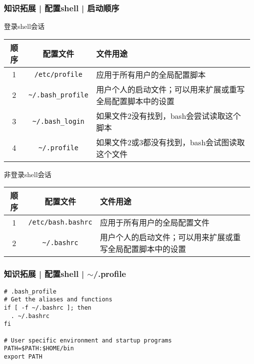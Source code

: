 \begin{frame}
  \frametitle{知识拓展 | 配置shell | 启动顺序}
  \begin{block}{登录shell会话}
  \begin{table}
    \centering
    \begin{tabularx}{\textwidth}{ccX}
      \hline
      \rowcolor{blue!50}顺序 & 配置文件 & 文件用途\\
      \hline
      1 & \verb|/etc/profile| & 应用于所有用户的全局配置脚本\\
      2 & \verb|~/.bash_profile| & 用户个人的启动文件；可以用来扩展或重写全局配置脚本中的设置\\
      3 & \verb|~/.bash_login| & 如果文件2没有找到，bash会尝试读取这个脚本\\
      4 & \alert{\verb|~/.profile|} & 如果文件2或3都没有找到，bash会试图读取这个文件\\
      \hline
    \end{tabularx}
  \end{table}
  \vspace{-1em}
  \end{block}
  \pause
  \begin{block}{非登录shell会话}
  \begin{table}
    \centering
    \begin{tabularx}{\textwidth}{ccX}
      \hline
      \rowcolor{blue!50}顺序 & 配置文件 & 文件用途\\
      \hline
      1 & \verb|/etc/bash.bashrc| & 应用于所有用户的全局配置文件\\
      2 & \alert{\verb|~/.bashrc|} & 用户个人的启动文件；可以用来扩展或重写全局配置脚本中的设置\\
      \hline
    \end{tabularx}
  \end{table}
  \end{block}
\end{frame}

\begin{frame}[fragile]
  \frametitle{知识拓展 | 配置shell | $\sim$/.profile}
\begin{lstlisting}
# .bash_profile
# Get the aliases and functions
if [ -f ~/.bashrc ]; then
  . ~/.bashrc
fi

# User specific environment and startup programs
PATH=$PATH:$HOME/bin
export PATH
\end{lstlisting}
\end{frame}

